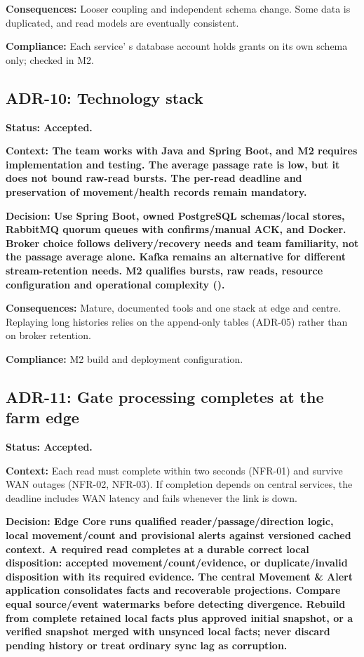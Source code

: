 \textbf{Consequences:} Looser coupling and independent schema change.
Some data is duplicated, and read models are eventually consistent.

\textbf{Compliance:} Each service' s database account
holds grants on its own schema only; checked in M2.

\subsection{ADR-10: Technology stack}\label{adr:10}

\textbf{Status: Accepted.}

\textbf{Context: The team works with Java and Spring Boot, and M2
requires implementation and testing. The average passage rate is low,
but it does not bound raw-read bursts. The per-read deadline and
preservation of movement/health records remain mandatory.}

\textbf{Decision: Use Spring Boot, owned PostgreSQL schemas/local
stores, RabbitMQ quorum queues with confirms/manual ACK, and Docker. Broker choice follows delivery/recovery needs and
team familiarity, not the passage average alone. Kafka remains an
alternative for different stream-retention needs. M2 qualifies bursts,
raw reads, resource configuration and operational complexity ().}

\textbf{Consequences:} Mature, documented tools and one stack at edge
and centre. Replaying long histories relies on the append-only tables
(ADR-05) rather than on broker retention.

\textbf{Compliance:} M2 build and deployment configuration.

\subsection{ADR-11: Gate processing completes at the farm edge}\label{adr:11}

\textbf{Status: Accepted.}

\textbf{Context:} Each read must complete within two seconds (NFR-01)
and survive WAN outages (NFR-02, NFR-03). If completion depends on
central services, the deadline includes WAN latency and fails whenever
the link is down.

\textbf{Decision: Edge Core runs qualified reader/passage/direction
logic, local movement/count and provisional alerts against versioned
cached context. A required read completes at a durable correct local
disposition: accepted movement/count/evidence, or duplicate/invalid
disposition with its required evidence. The central Movement \& Alert
application consolidates facts and recoverable projections. Compare
equal source/event watermarks before detecting divergence. Rebuild from
complete retained local facts plus approved initial snapshot, or a
verified snapshot merged with unsynced local facts; never discard
pending history or treat ordinary sync lag as corruption.}

